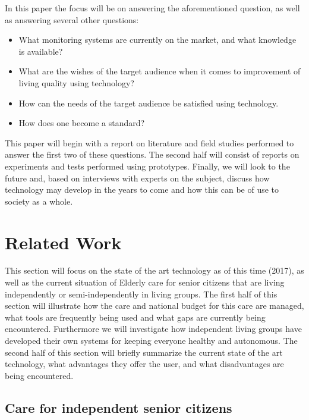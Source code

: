 \documentclass{below-ext}
\begin{document}
In this paper the focus will be on answering the aforementioned question, as well as answering several other questions:
\begin{itemize}
\item What monitoring systems are currently on the market, and what knowledge is available?
\item  What are the wishes of the target audience when it comes to improvement of living quality using technology?
\item How can the needs of the target audience be satisfied using technology.
\item How does one become a standard?
\end{itemize}

This paper will begin with a report on literature and field studies performed to answer the first two of these questions. The second half will consist of reports on experiments and tests performed using prototypes. Finally, we will look to the future and, based on interviews with experts on the subject, discuss how technology may develop in the years to come and how this can be of use to society as a whole.


\section{Related Work}
This section will focus on the state of the art technology as of this time (2017), as well as the current situation of Elderly care for senior citizens that are living independently or semi-independently in living groups. The first half of this section will illustrate how the care and national budget for this care are managed, what tools are frequently being used and what gaps are currently being encountered. Furthermore we will investigate how independent living groups have developed their own systems for keeping everyone healthy and autonomous. The second half of this section will briefly summarize the current state of the art technology, what advantages they offer the user, and what disadvantages are being encountered.



\subsection{Care for independent senior citizens}
\end{document}
